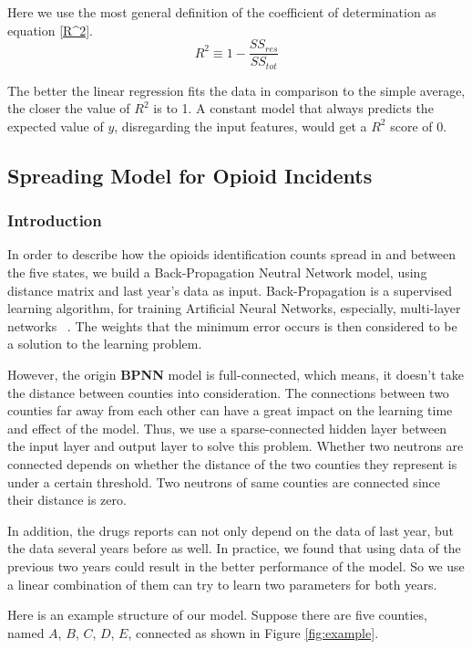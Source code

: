 \documentclass{mcmthesis}
\begin{document}
    Here we use the most general definition of the coefficient of determination as equation \ref{R^2}.
    \begin{equation}\label{R^2}
        R^2\equiv 1-\frac{SS_{res}}{SS_{tot}}
    \end{equation}
    
   The better the linear regression fits the data in comparison to the simple average, the closer the value of $R^{2}$ is to 1. A constant model that always predicts the expected value of $y$, disregarding the input features, would get a $R^2$ score of 0.

\subsection{ Spreading Model for Opioid Incidents }

\subsubsection{Introduction}    

In order to describe how the opioids identification counts spread in and between the five states, we build a Back-Propagation Neutral Network model, using distance matrix and last year's data as input. Back-Propagation is a supervised learning algorithm, for training Artificial Neural Networks, especially,  multi-layer networks ~\cite{AI}. The weights that the minimum error occurs is then considered to be a solution to the learning problem. 

However, the origin \textbf{BPNN} model is full-connected, which means, it doesn't take the distance between counties into consideration. The connections between two counties far away from each other can have a great impact on the learning time and effect of the model. Thus, we use a sparse-connected hidden layer between the input layer and output layer to solve this problem. Whether two neutrons are connected depends on whether the distance of the two counties they represent is under a certain threshold. Two neutrons of same counties are connected since their distance is zero.

In addition, the drugs reports can not only depend on the data of last year, but the data several years before as well. In practice, we found that using data of the previous two years could result in the better performance of the model. So we use a linear combination of them can try to learn two parameters for both years.

Here is an example structure of our model. Suppose there are five counties, named $A$, $B$, $C$, $D$, $E$, connected as shown in Figure \ref{fig:example}.
\end{document}
